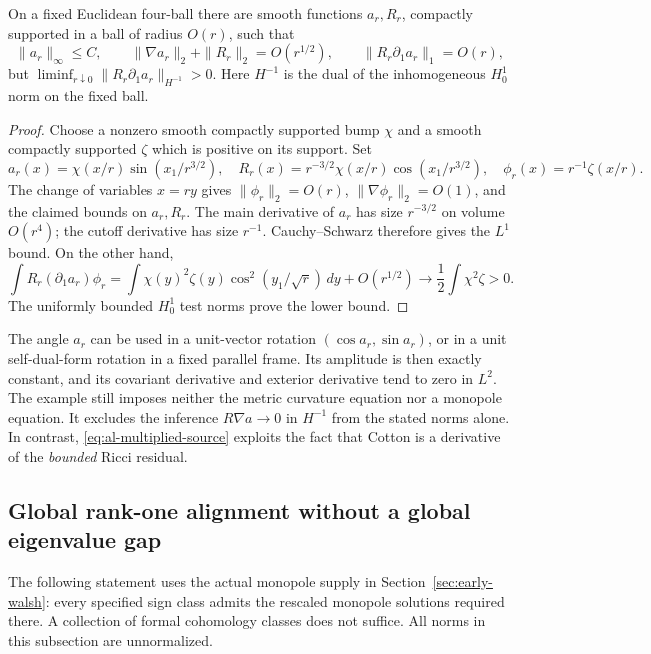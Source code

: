 \begin{proposition}
\label{prop:al-commutator}
On a fixed Euclidean four-ball there are smooth functions $a_r,R_r$,
compactly supported in a ball of radius $O(r)$, such that
\[
 \|a_r\|_\infty\le C,\qquad
 \|\nabla a_r\|_2+\|R_r\|_2=O(r^{1/2}),\qquad
 \|R_r\partial_1a_r\|_1=O(r),
\]
but $\liminf_{r\downarrow0}\|R_r\partial_1a_r\|_{H^{-1}}>0$.
Here $H^{-1}$ is the dual of the inhomogeneous $H^1_0$ norm on the fixed
ball.
\end{proposition}

\begin{proof}
Choose a nonzero smooth compactly supported bump $\chi$ and a smooth
compactly supported $\zeta$ which is positive on its support.  Set
\[
 a_r(x)=\chi(x/r)\sin(x_1/r^{3/2}),\quad
 R_r(x)=r^{-3/2}\chi(x/r)\cos(x_1/r^{3/2}),\quad
 \phi_r(x)=r^{-1}\zeta(x/r).
\]
The change of variables $x=ry$ gives
$\|\phi_r\|_2=O(r)$, $\|\nabla\phi_r\|_2=O(1)$, and the claimed
bounds on $a_r,R_r$.  The main derivative of $a_r$ has size $r^{-3/2}$
on volume $O(r^4)$; the cutoff derivative has size $r^{-1}$.
Cauchy--Schwarz therefore gives the $L^1$ bound.  On the other hand,
\[
 \int R_r(\partial_1a_r)\phi_r
 =\int\chi(y)^2\zeta(y)\cos^2(y_1/\sqrt r)\,dy+O(r^{1/2})
 \longrightarrow\frac12\int\chi^2\zeta>0.
\]
The uniformly bounded $H^1_0$ test norms prove the lower bound.
\end{proof}

The angle $a_r$ can be used in a unit-vector rotation
$(\cos a_r,\sin a_r)$, or in a unit self-dual-form rotation in a fixed
parallel frame.  Its amplitude is then exactly constant, and its
covariant derivative and exterior derivative tend to zero in $L^2$.
The example still imposes neither the metric curvature equation nor a
monopole equation.  It excludes the inference
$R\nabla a\to0$ in $H^{-1}$ from the stated norms alone.  In contrast,
\eqref{eq:al-multiplied-source} exploits the fact that Cotton is a
derivative of the \emph{bounded} Ricci residual.

\subsection{Global rank-one alignment without a global eigenvalue gap}

The following statement uses the actual monopole supply in
Section~\ref{sec:early-walsh}: every specified sign class admits the
rescaled monopole solutions required there.  A collection of formal
cohomology classes does not suffice.  All norms in this subsection are
unnormalized.

